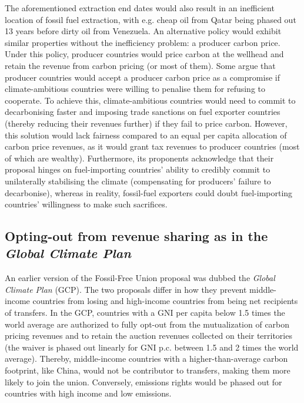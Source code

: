 \documentclass[12pt,english]{article}
\begin{document}
The aforementioned extraction end dates would also result in an inefficient location of fossil fuel extraction,\citep{coulomb_bad_2025} with e.g. cheap oil from Qatar being phased out 13 years before dirty oil from Venezuela. An alternative policy would exhibit similar properties without the inefficiency problem: a producer carbon price. Under this policy, producer countries would price carbon at the wellhead and retain the revenue from carbon pricing (or most of them). Some argue that producer countries would accept a producer carbon price as a compromise if climate-ambitious countries were willing to penalise them for refusing to cooperate. To achieve this, climate-ambitious countries would need to commit to decarbonising faster and imposing trade sanctions on fuel exporter countries (thereby reducing their revenues further) if they fail to price carbon.\citep{peszko_cooperative_2019} However, this solution would lack fairness compared to an equal per capita allocation of carbon price revenues, as it would grant tax revenues to producer countries (most of which are wealthy). Furthermore, its proponents acknowledge that their proposal hinges on fuel-importing countries' ability to credibly commit to unilaterally stabilising the climate (compensating for producers' failure to decarbonise), whereas in reality, fossil-fuel exporters could doubt fuel-importing countries' willingness to make such sacrifices.


\subsection{Opting-out from revenue sharing as in the \textit{Global Climate Plan}}\label{subsec:gcp}

An earlier version of the Fossil-Free Union proposal was dubbed the \textit{Global Climate Plan} (GCP).\cite{fabre_global_2023,fabre_global_2024} The two proposals differ in how they prevent middle-income countries from losing %
and high-income countries from being net recipients of transfers. In the GCP, countries with a GNI per capita below 1.5 times the world average are authorized to fully opt-out from the mutualization of carbon pricing revenues and to retain the auction revenues collected on their territories (the waiver is phased out linearly for GNI p.c. between 1.5 and 2 times the world average). Thereby, middle-income countries with a higher-than-average carbon footprint, like China, would not be contributor to transfers, making them more likely to join the union. Conversely, emissions rights would be phased out for countries with high income and low emissions. 
\end{document}

